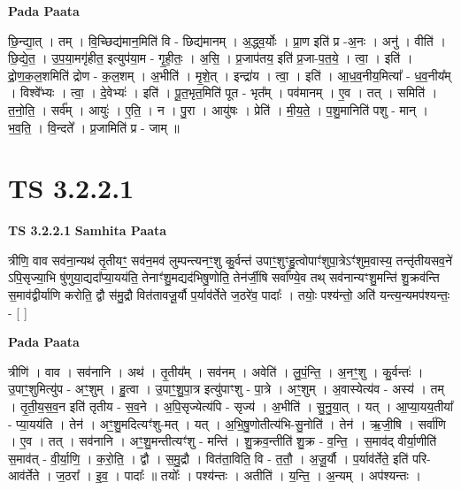 \documentclass[17pt]{extarticle}
\begin{document}
\textbf{Pada Paata} \newline

छि॒न्द्या॒त् । तम् । वि॒च्छिद्य॑मान॒मिति॑ वि - छिद्य॑मानम् । अ॒द्ध्व॒र्योः । प्रा॒ण इति॑ प्र -अ॒नः । अनु॑ । वीति॑ । छि॒द्ये॒त॒ । उ॒प॒या॒मगृ॑हीत॒ इत्युप॑या॒म - गृ॒ही॒तः॒ । अ॒सि॒ । प्र॒जाप॑तय॒ इति॑ प्र॒जा-प॒त॒ये॒ । त्वा॒ । इति॑ । द्रो॒ण॒क॒ल॒शमिति॑ द्रोण - क॒ल॒शम् । अ॒भीति॑ । मृ॒शे॒त् । इन्द्रा॑य । त्वा॒ । इति॑ । आ॒ध॒व॒नीय॒मित्या᳚ - ध॒व॒नीय᳚म् । विश्वे᳚भ्यः । त्वा॒ । दे॒वेभ्यः॑ । इति॑ । पू॒त॒भृत॒मिति॑ पूत - भृत᳚म् । पव॑मानम् । ए॒व । तत् । समिति॑ । त॒नो॒ति॒ । सर्व᳚म् । आयुः॑ । ए॒ति॒ । न । पु॒रा । आयु॑षः । प्रेति॑ । मी॒य॒ते॒ । प॒शु॒मानिति॑ पशु - मान् । भ॒व॒ति॒ । वि॒न्दते᳚ । प्र॒जामिति॑ प्र - जाम् ॥  \newline





\section{ TS 3.2.2.1 }

\textbf{TS 3.2.2.1 } \newline
\textbf{Samhita Paata} \newline

त्रीणि॒ वाव सव॑ना॒न्यथ॑ तृ॒तीयꣳ॒॒ सव॑न॒मव॑ लुम्पन्त्यनꣳ॒॒शु कु॒र्वन्त॑ उपाꣳ॒॒शुꣳहु॒त्वोपाꣳ॑शुपा॒त्रेऽꣳ॑शुम॒वास्य॒ तन्तृ॑तीयसव॒ने॑ ऽपि॒सृज्या॒भि षु॑णुया॒द्यदा᳚प्या॒यय॑ति॒ तेनाꣳ॑शु॒मद्यद॑भिषु॒णोति॒ तेन॑र्जी॒षि सर्वा᳚ण्ये॒व तथ् सव॑नान्यꣳशु॒मन्ति॑ शु॒क्रव॑न्ति स॒माव॑द्वीर्याणि करोति॒ द्वौ स॑मु॒द्रौ वित॑तावजू॒र्यौ प॒र्याव॑र्तेते ज॒ठरे॑व॒ पादाः᳚ । तयोः॒ पश्य॑न्तो॒ अति॑ यन्त्य॒न्यमप॑श्यन्तः॒ - [  ] \newline

\textbf{Pada Paata} \newline

त्रीणि॑ । वाव । सव॑नानि । अथ॑ । तृ॒तीय᳚म् । सव॑नम् । अवेति॑ । लु॒पं॒न्ति॒ । अ॒नꣳ॒॒शु । कु॒र्वन्तः॑ । उ॒पाꣳ॒॒शुमित्यु॑प - अꣳ॒॒शुम् । हु॒त्वा । उ॒पाꣳ॒॒शु॒पा॒त्र इत्यु॑पाꣳशु - पा॒त्रे । अꣳ॒॒शुम् । अ॒वास्येत्य॑व - अस्य॑ । तम् । तृ॒ती॒य॒स॒व॒न इति॑ तृतीय - स॒व॒ने । अ॒पि॒सृज्येत्य॑पि - सृज्य॑ । अ॒भीति॑ । सु॒नु॒या॒त् । यत् । आ॒प्या॒यय॒तीया᳚ - प्या॒यय॑ति । तेन॑ । अꣳ॒॒शु॒मदित्यꣳ॑शु-मत् । यत् । अ॒भि॒षु॒णोतीत्य॑भि-सु॒नोति॑ । तेन॑ । ऋ॒जी॒षि । सर्वा॑णि । ए॒व । तत् । सव॑नानि । अꣳ॒॒शु॒मन्तीत्यꣳ॑शु - मन्ति॑ । शु॒क्रव॒न्तीति॑ शु॒क्र - व॒न्ति॒ । स॒माव॑द् वीर्या॒णीति॑ स॒माव॑त् - वी॒र्या॒णि॒ । क॒रो॒ति॒ । द्वौ । स॒मु॒द्रौ । वित॑ता॒विति॒ वि - त॒तौ॒ । अ॒जू॒र्यौ । प॒र्याव॑र्तेते॒ इति॑ परि-आव॑र्तेते । ज॒ठरा᳚ । इ॒व॒ । पादाः᳚ ॥ तयोः᳚ । पश्य॑न्तः । अतीति॑ । य॒न्ति॒ । अ॒न्यम् । अप॑श्यन्तः ।  \newline
\end{document}
